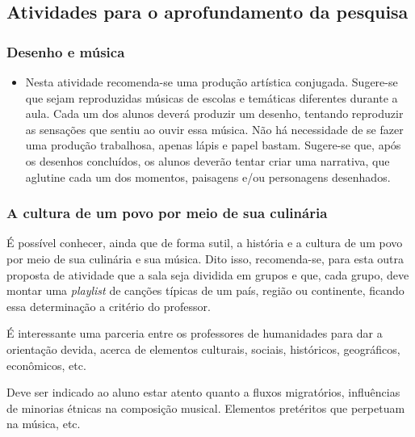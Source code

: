 \documentclass[12pt]{extarticle}
\begin{document}
\subsection{Atividades para o aprofundamento da pesquisa}

\subsubsection{Desenho e música}


\begin{itemize}
\item
  Nesta atividade recomenda-se uma produção artística conjugada.
  Sugere-se que sejam reproduzidas músicas de escolas e temáticas
  diferentes durante a aula. Cada um dos alunos deverá produzir um
  desenho, tentando reproduzir as sensações que sentiu ao ouvir essa
  música. Não há necessidade de se fazer uma produção trabalhosa, apenas
  lápis e papel bastam. Sugere-se que, após os desenhos concluídos, os
  alunos deverão tentar criar uma narrativa, que aglutine cada um dos
  momentos, paisagens e/ou personagens desenhados.
\end{itemize}

\subsubsection{A cultura de um povo por meio de sua culinária}

É possível conhecer, ainda que de forma sutil, a história e a
  cultura de um povo por meio de sua culinária e sua música. Dito isso,
  recomenda-se, para esta outra proposta de atividade que a sala seja
  dividida em grupos e que, cada grupo, deve montar uma \emph{playlist} de
  canções típicas de um país, região ou continente, ficando essa
  determinação a critério do professor.

É interessante uma parceria entre os professores de humanidades
para dar a orientação devida, acerca de elementos culturais, sociais,
históricos, geográficos, econômicos, etc.

{Deve ser indicado ao aluno estar atento quanto a fluxos
migratórios, influências de minorias étnicas na composição musical.
Elementos pretéritos que perpetuam na música, etc. }

\end{document}
